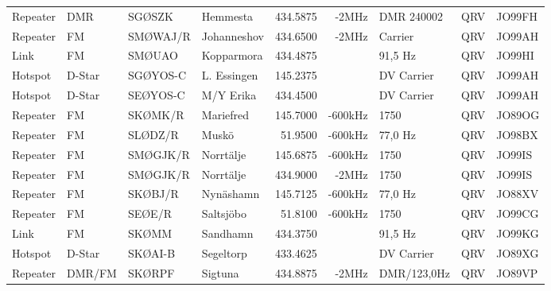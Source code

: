 \documentclass[10pt,swedish,a4paper,twoside]{article}
\begin{document}
\begin{landscape}
\begin{longtable}{llllrrlcl}
	Repeater          & DMR          & SGØSZK        & Hemmesta     &          434.5875 &          -2MHz & DMR 240002      &       QRV       & JO99FH           \\
	Repeater          & FM           & SMØWAJ/R      & Johanneshov  &          434.6500 &          -2MHz & Carrier         &       QRV       & JO99AH           \\
	Link              & FM           & SMØUAO        & Kopparmora   &          434.4875 &                & 91,5 Hz         &       QRV       & JO99HI           \\
	Hotspot           & D-Star       & SGØYOS-C      & L. Essingen  &          145.2375 &                & DV Carrier      &       QRV       & JO99AH           \\
	Hotspot           & D-Star       & SEØYOS-C      & M/Y Erika    &          434.4500 &                & DV Carrier      &       QRV       & JO99AH           \\
	Repeater          & FM           & SKØMK/R       & Mariefred    &          145.7000 &        -600kHz & 1750           &       QRV       & JO89OG           \\
	Repeater          & FM           & SLØDZ/R       & Muskö        &           51.9500 &        -600kHz & 77,0 Hz          &       QRV       & JO98BX           \\
	Repeater          & FM           & SMØGJK/R      & Norrtälje    &          145.6875 &        -600kHz & 1750         &       QRV       & JO99IS           \\
	Repeater          & FM           & SMØGJK/R      & Norrtälje    &          434.9000 &          -2MHz & 1750         &       QRV       & JO99IS           \\
	Repeater          & FM           & SKØBJ/R       & Nynäshamn    &          145.7125 &        -600kHz & 77,0 Hz         &       QRV       & JO88XV           \\
	Repeater          & FM           & SEØE/R        & Saltsjöbo    &           51.8100 &        -600kHz & 1750         &       QRV       & JO99CG           \\
	Link              & FM           & SKØMM         & Sandhamn     &          434.3750 &                & 91,5 Hz         &       QRV       & JO99KG           \\
	Hotspot           & D-Star       & SKØAI-B       & Segeltorp    &          433.4625 &                & DV Carrier      &       QRV       & JO89XG           \\
	Repeater          & DMR/FM       & SKØRPF        & Sigtuna      &          434.8875 &          -2MHz & DMR/123,0Hz    &       QRV       & JO89VP           \\

\end{longtable}
\end{landscape}
\end{document}

